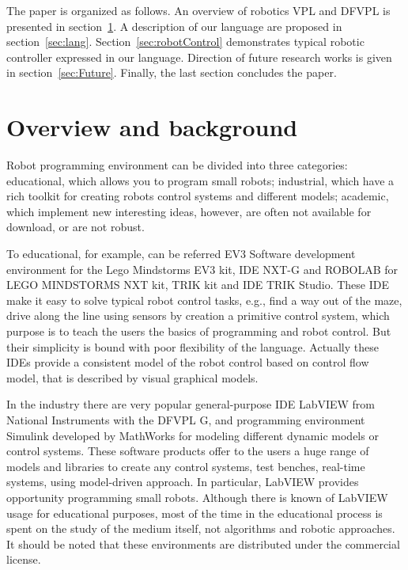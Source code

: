 \documentclass[conference,compsoc]{IEEEtran}
\begin{document}
The paper is organized as follows. An overview of robotics VPL and DFVPL is presented in section~\ref{sec:Overview}. A description of our language are proposed in section~\ref{sec:lang}. Section~\ref{sec:robotControl} demonstrates typical robotic controller expressed in our language. Direction of future research works is given in section~\ref{sec:Future}. Finally, the last section concludes the paper.


\section{Overview and background}
\label{sec:Overview}
Robot programming environment can be divided into three categories: educational, which allows you to program small robots; industrial, which have a rich toolkit for creating robots control systems and different models; academic, which implement new interesting ideas, however, are often not available for download, or are not robust.

To educational, for example, can be referred EV3 Software development environment for the Lego Mindstorms EV3 kit, IDE NXT-G and ROBOLAB for LEGO MINDSTORMS NXT kit, TRIK kit and IDE TRIK Studio. These IDE make it easy to solve typical robot control tasks, e.g., find a way out of the maze, drive along the line using sensors by creation a primitive control system, which purpose is to teach the users the basics of programming and robot control. But their simplicity is bound with poor flexibility of the language. Actually these IDEs provide a consistent model of the robot control based on control flow model, that is described by visual graphical models.

In the industry there are very popular general-purpose IDE LabVIEW from National Instruments with the DFVPL G, and programming environment Simulink developed by MathWorks for modeling different dynamic models or control systems. These software products offer to the users a huge range of models and libraries to create any control systems, test benches, real-time systems, using model-driven approach. In particular, LabVIEW provides opportunity programming small robots. Although there is known of LabVIEW usage for educational purposes\cite{1_gomez-de-gabriel_mandow_fernandez-lozano_garcia-cerezo_2011}, most of the time in the educational process is spent on the study of the medium itself, not algorithms and robotic approaches. It should be noted that these environments are distributed under the commercial license.
\end{document}
